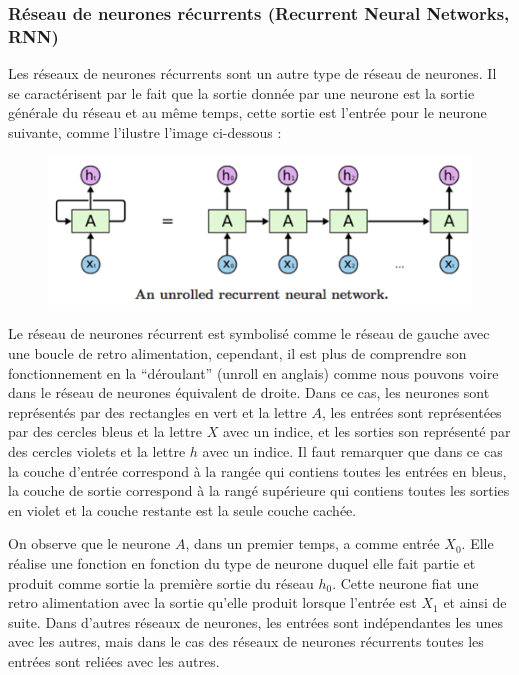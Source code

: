 \documentclass[conference,onecolumn]{IEEEtran}
\begin{document}
\subsubsection{Réseau de neurones récurrents (Recurrent Neural Networks, RNN)}

Les réseaux de neurones récurrents sont un autre type de réseau de neurones. Il se caractérisent par le fait que la sortie donnée par une neurone est la sortie générale du réseau et au même temps, cette sortie est l’entrée pour le neurone suivante, comme l'ilustre l'image ci-dessous : 

 \begin{figure}[H]
 \centering
    \includegraphics[scale=0.5]{img14.png}
\end{figure}


Le réseau de neurones récurrent est symbolisé comme le réseau de gauche avec une boucle de retro alimentation, cependant, il est plus de comprendre son fonctionnement en la “déroulant” (unroll en anglais) comme nous pouvons voire dans le réseau de neurones équivalent de droite. Dans ce cas, les neurones sont représentés par des rectangles en vert et la lettre $A$, les entrées sont représentées par des cercles bleus et la lettre $X$ avec un indice, et les sorties son représenté par des cercles violets et la lettre $h$ avec un indice. Il faut remarquer que dans ce cas la couche d’entrée correspond à la rangée qui contiens toutes les entrées en bleus, la couche de sortie correspond à la rangé supérieure qui contiens toutes les sorties en violet et la couche restante est la seule couche cachée. 

On observe que le neurone $A$, dans un premier temps, a comme entrée $X_0$. Elle réalise une fonction en fonction du type de neurone duquel elle fait partie et produit comme sortie la première sortie du réseau $h_0$.  Cette neurone fiat une retro alimentation avec la sortie qu’elle produit lorsque l’entrée est $X_1$ et ainsi de suite. Dans d’autres réseaux de neurones, les entrées sont indépendantes les unes avec les autres, mais dans le cas des réseaux de neurones récurrents toutes les entrées sont reliées avec les autres. 
\end{document}
